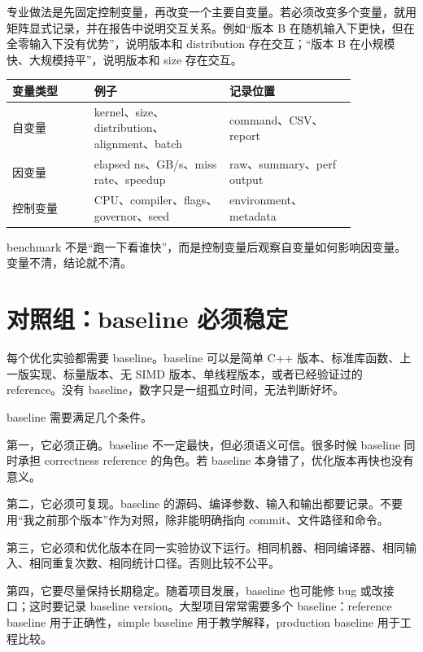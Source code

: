 专业做法是先固定控制变量，再改变一个主要自变量。若必须改变多个变量，就用矩阵显式记录，并在报告中说明交互关系。例如“版本 B 在随机输入下更快，但在全零输入下没有优势”，说明版本和 distribution 存在交互；“版本 B 在小规模快、大规模持平”，说明版本和 size 存在交互。

\begin{center}
\begin{tabular}{p{0.20\linewidth}p{0.33\linewidth}p{0.31\linewidth}}
\toprule
变量类型 & 例子 & 记录位置 \\
\midrule
自变量 & kernel、size、distribution、alignment、batch & command、CSV、report \\
因变量 & elapsed ns、GB/s、miss rate、speedup & raw、summary、perf output \\
控制变量 & CPU、compiler、flags、governor、seed & environment、metadata \\
\bottomrule
\end{tabular}
\end{center}

\begin{keyidea}
benchmark 不是“跑一下看谁快”，而是控制变量后观察自变量如何影响因变量。变量不清，结论就不清。
\end{keyidea}

\section{对照组：baseline 必须稳定}

每个优化实验都需要 baseline。baseline 可以是简单 C++ 版本、标准库函数、上一版实现、标量版本、无 SIMD 版本、单线程版本，或者已经验证过的 reference。没有 baseline，数字只是一组孤立时间，无法判断好坏。

baseline 需要满足几个条件。

第一，它必须正确。baseline 不一定最快，但必须语义可信。很多时候 baseline 同时承担 correctness reference 的角色。若 baseline 本身错了，优化版本再快也没有意义。

第二，它必须可复现。baseline 的源码、编译参数、输入和输出都要记录。不要用“我之前那个版本”作为对照，除非能明确指向 commit、文件路径和命令。

第三，它必须和优化版本在同一实验协议下运行。相同机器、相同编译器、相同输入、相同重复次数、相同统计口径。否则比较不公平。

第四，它要尽量保持长期稳定。随着项目发展，baseline 也可能修 bug 或改接口；这时要记录 baseline version。大型项目常常需要多个 baseline：reference baseline 用于正确性，simple baseline 用于教学解释，production baseline 用于工程比较。

